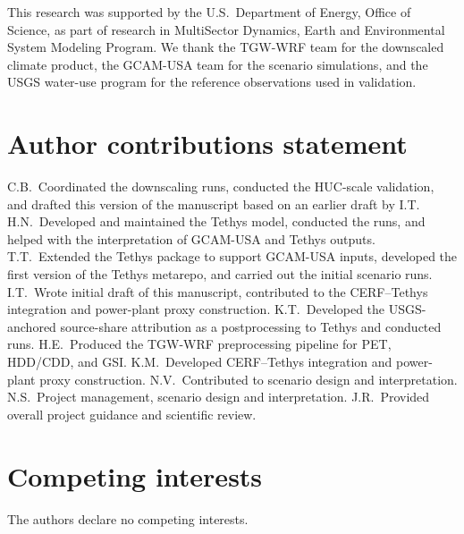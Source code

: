 \documentclass[fleqn,10pt]{wlscirep}
\begin{document}
This research was supported by the U.S.~Department of Energy, Office of Science, as part of research in MultiSector Dynamics, Earth and Environmental System Modeling Program. We thank the TGW-WRF team for the downscaled climate product, the GCAM-USA team for the scenario simulations, and the USGS water-use program for the reference observations used in validation.

\section*{Author contributions statement}

C.B.~Coordinated the downscaling runs, conducted the HUC-scale validation, and drafted this version of the manuscript based on an earlier draft by I.T.
H.N.~Developed and maintained the Tethys model, conducted the runs, and helped with the interpretation of GCAM-USA and Tethys outputs.
T.T.~Extended the Tethys package to support GCAM-USA inputs, developed the first version of the Tethys metarepo, and carried out the initial scenario runs.
I.T.~Wrote initial draft of this manuscript, contributed to the CERF--Tethys integration and power-plant proxy construction.
K.T.~Developed the USGS-anchored source-share attribution as a postprocessing to Tethys and conducted runs.
H.E.~Produced the TGW-WRF preprocessing pipeline for PET, HDD/CDD, and GSI.
K.M.~Developed CERF--Tethys integration and power-plant proxy construction.
N.V.~Contributed to scenario design and interpretation.
N.S.~Project management, scenario design and interpretation.
J.R.~Provided overall project guidance and scientific review.

\section*{Competing interests}

The authors declare no competing interests.


\end{document}

